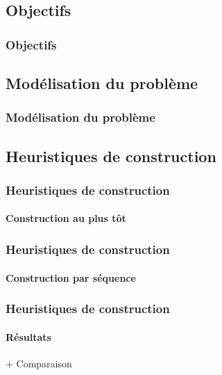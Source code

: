 \subsection{Objectifs}
\begin{frame}
	\frametitle{Objectifs}
\end{frame}

\subsection{Modélisation du problème}
\begin{frame}
	\frametitle{Modélisation du problème}
\end{frame}

\subsection{Heuristiques de construction}
\begin{frame}
	\frametitle{Heuristiques de construction}
	\framesubtitle{Construction au plus tôt}
\end{frame}
\begin{frame}
	\frametitle{Heuristiques de construction}
	\framesubtitle{Construction par séquence}
\end{frame}
\begin{frame}
	\frametitle{Heuristiques de construction}
	\framesubtitle{Résultats}
	+ Comparaison
\end{frame}